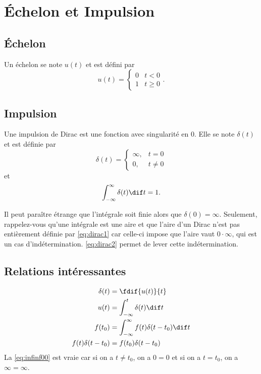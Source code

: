 \section{Échelon et Impulsion}
\subsection{Échelon}
Un échelon se note $u(t)$ et est défini par
\[ u(t) = \begin{cases}
    0 & t < 0\\
    1 & t \geq 0
\end{cases}. \]

\subsection{Impulsion}
\label{app:dirac}
Une impulsion de Dirac est une fonction avec singularité en 0.
Elle se note $\delta(t)$ et est définie par
\begin{equation}
  \label{eq:dirac1}
  \delta(t) =
  \begin{cases}
    \infty, & t = 0\\
    0, & t \neq 0
  \end{cases}
\end{equation}
et
\begin{equation}
  \label{eq:dirac2}
  \int_{-\infty}^{\infty} \delta(t) \dif t = 1.
\end{equation}

Il peut paraître étrange que l'intégrale soit finie alors que
$\delta(0) = \infty$.
Seulement, rappelez-vous qu'une intégrale est une aire et que
l'aire d'un Dirac n'est pas entièrement définie par \eqref{eq:dirac1}
car celle-ci impose que l'aire vaut $0 \cdot \infty$, qui est un cas
d'indétermination.
\eqref{eq:dirac2} permet de lever cette indétermination.

\subsection{Relations intéressantes}
\begin{align}
  \nonumber
  \delta(t) & = \fdif{u(t)}{t}\\
  \label{eq:uintdelta}
  u(t) & = \int_{-\infty}^t \delta(t) \dif t\\
  \nonumber
  f(t_0) & = \int_{-\infty}^\infty f(t)\delta(t-t_0) \dif t\\
  \label{eq:infinf00}
  f(t) \delta(t-t_0) & = f(t_0)\delta(t-t_0)
\end{align}
La \eqref{eq:infinf00} est vraie car si on a $t \neq t_0$, on a $0 = 0$
et si on a $t = t_0$, on a $\infty = \infty$.

